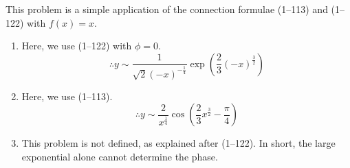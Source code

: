 \item
This problem is a simple application of the connection formulae  (1--113) and (1--122) with $f(x) = x$.

\begin{enumerate}[wide, labelindent = 0pt, label = (\alph*)]
\item Here, we use  (1--122) with $\phi = 0$.
\[
	\therefore y \sim \frac{1}{\sqrt{2} {(-x)}^{-\frac{1}{4}}} \exp\left( \frac{2}{3} {(-x)}^{\frac{3}{2}} \right)
\]
\item Here, we use  (1--113).
\[
	\therefore y \sim \frac{2}{x^{\frac{1}{4}}} \cos\left( \frac{2}{3}x^{\frac{3}{2}} - \frac{\pi}{4} \right)
\]
\item This problem is not defined, as explained after  (1--122).
In short, the large exponential alone cannot determine the phase.

\end{enumerate}